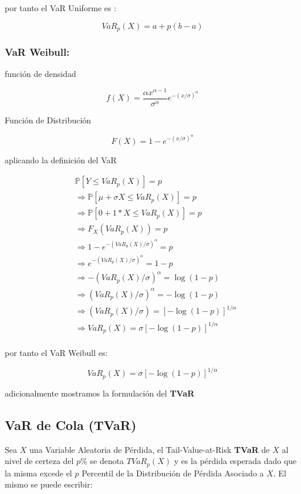 \documentclass[10pt,]{article}
\begin{document}
por tanto el VaR Uniforme es :

\[VaR_{p}(X)=a+p(b-a)\]

\hypertarget{var-weibull}{%
\subsubsection{\texorpdfstring{\textbf{VaR
Weibull:}}{VaR Weibull:}}\label{var-weibull}}

función de densidad

\[f(X)= \frac{\alpha x^{\alpha-1}}{\sigma^{\alpha}}e^{-(x/\sigma)^\alpha}\]

Función de Distribución

\[F(X)= 1-e^{-(x/\sigma)^\alpha}\]

aplicando la definición del VaR

\[\begin{array}{rl}  
&\displaystyle \mathbb{P}[Y \leq VaR_{p}(X)]=p\\
&\displaystyle \Rightarrow \mathbb{P}[\mu + \sigma X \leq VaR_p(X)] = p\\
&\displaystyle \Rightarrow \mathbb{P}[0 + 1* X \leq VaR_p(X)] = p\\
&\displaystyle \Rightarrow F_X(VaR_{p}(X)) = p\\
&\displaystyle \Rightarrow 1-e^{-(VaR_{p}(X)/\sigma)^\alpha}=p\\
&\displaystyle \Rightarrow e^{-(VaR_{p}(X)/\sigma)^\alpha}=1-p\\
&\displaystyle \Rightarrow -(VaR_{p}(X)/\sigma)^\alpha=\log(1-p)\\
&\displaystyle \Rightarrow (VaR_{p}(X)/\sigma)^\alpha=-\log(1-p)\\
&\displaystyle \Rightarrow (VaR_{p}(X)/\sigma)=[-\log(1-p)]^{1/\alpha}\\
&\displaystyle \Rightarrow VaR_{p}(X)=\sigma [-\log(1-p)]^{1/\alpha}\\
\end{array}\]

por tanto el VaR Weibull es:

\[VaR_{p}(X)=\sigma [-\log(1-p)]^{1/\alpha}\]

adicionalmente mostramos la formulación del \textbf{TVaR}

\hypertarget{var-de-cola-tvar}{%
\subsection{VaR de Cola (TVaR)}\label{var-de-cola-tvar}}

Sea \(X\) una Variable Aleatoria de Pérdida, el Tail-Value-at-Risk
\textbf{TVaR} de \(X\) al nivel de certeza del \(p\)\% se denota
\(TVaR_{p}(X)\) y es la pérdida esperada dado que la misma excede el
\(p\) Percentil de la Distribución de Pérdida Asociado a \(X\). El mismo
se puede escribir:
\end{document}
